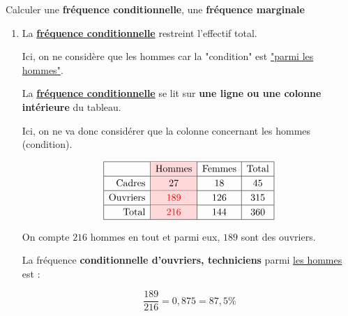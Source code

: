 \begin{methode}{Calculer une \textbf{fréquence conditionnelle}, une \textbf{fréquence marginale}}
\begin{correction}
\begin{enumerate}
			      On compte $360$ employés en tout et $45$ sont des cadres.

			      La \textbf{\ul{fréquence marginale}} de cadres est donc égale à :

			      $$\dfrac{45}{360} = 0,125 = 12,5 \%$$

			\item La \textbf{\ul{fréquence conditionnelle}} restreint l'effectif total.

			      Ici, on ne considère que les hommes car la "condition" est \ul{"parmi les hommes"}.

			      La \textbf{\ul{fréquence conditionnelle}} se lit sur \textbf{une ligne ou une colonne intérieure} du tableau.

			      Ici, on ne va donc considérer que la colonne concernant les hommes (condition).

			      $$
				      \def\arraystretch{1.2}
				      \begin{array}{|r|>{\columncolor{red!15}}c|c|c|} \hline
					      \text{}         & \text{Hommes}    & \text{Femmes} & \text{Total} \\ \hline
					      \text{Cadres}   & 27               & 18            & 45           \\ \hline
					      \text{Ouvriers} & {\color{red}189} & 126           & 315          \\ \hline
					      \text{Total}    & {\color{red}216} & 144           & 360          \\ \hline
				      \end{array}
			      $$

			      On compte $216$ hommes en tout et parmi eux, $189$ sont des ouvriers.

			      La fréquence \textbf{conditionnelle d'ouvriers, techniciens} parmi \ul{les hommes} est :

			      $$\dfrac{189}{216} = 0,875 = 87,5 \%$$
		\end{enumerate}
	\end{correction}
\end{methode}

